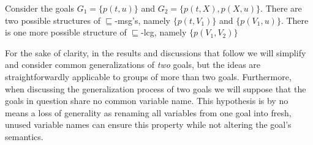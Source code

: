 \begin{example} 
	Consider the goals $G_1 = \{p(t,u)\}$ and $G_2 = \{p(t,X),p(X,u)\}$. There are two possible structures of $\sqsubseteq$-msg's, namely $\{p(t,V_1)\}$ and $\{p(V_1, u)\}$. There is one more possible structure of $\sqsubseteq$-lcg, namely $\{p(V_1, V_2)\}$
\end{example} 

For the sake of clarity, in the results and discussions that follow we will simplify and consider common generalizations of \textit{two} goals, but the ideas are straightforwardly applicable to groups of more than two goals. Furthermore, when discussing the generalization process of two goals we will suppose that the goals in question share no common variable name. This hypothesis is by no means a loss of generality as renaming all variables from one goal into fresh, unused variable names can ensure this property while not altering the goal's semantics.








